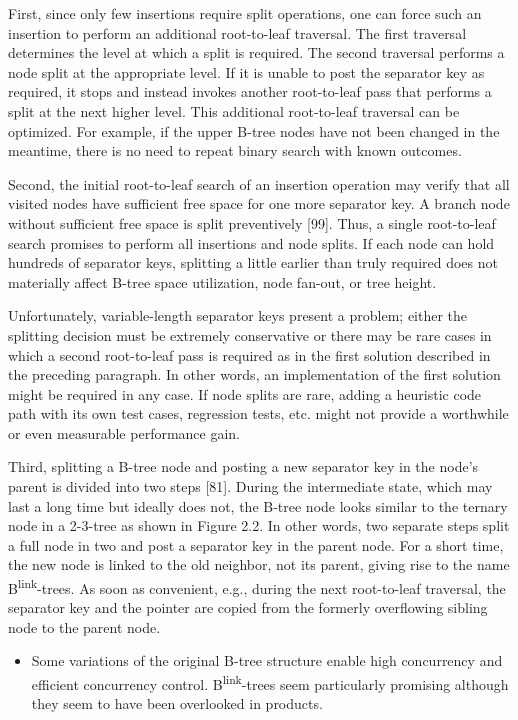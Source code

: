 First, since only few insertions require split operations, one can force
such an insertion to perform an additional root-to-leaf traversal. The
first traversal determines the level at which a split is required. The
second traversal performs a node split at the appropriate level. If it
is unable to post the separator key as required, it stops and instead
invokes another root-to-leaf pass that performs a split at the next
higher level. This additional root-to-leaf traversal can be optimized.
For example, if the upper B-tree nodes have not been changed in the
meantime, there is no need to repeat binary search with known outcomes.

Second, the initial root-to-leaf search of an insertion operation may
verify that all visited nodes have sufficient free space for one more
separator key. A branch node without sufficient free space is split
preventively {[}99{]}. Thus, a single root-to-leaf search promises to
perform all insertions and node splits. If each node can hold hundreds
of separator keys, splitting a little earlier than truly required does
not materially affect B-tree space utilization, node fan-out, or tree
height.

Unfortunately, variable-length separator keys present a problem; either
the splitting decision must be extremely conservative or there may be
rare cases in which a second root-to-leaf pass is required as in the
first solution described in the preceding paragraph. In other words, an
implementation of the first solution might be required in any case. If
node splits are rare, adding a heuristic code path with its own test
cases, regression tests, etc. might not provide a worthwhile or even
measurable performance gain.

Third, splitting a B-tree node and posting a new separator key in the
node's parent is divided into two steps {[}81{]}. During the
intermediate state, which may last a long time but ideally does not, the
B-tree node looks similar to the ternary node in a 2-3-tree as shown in
Figure 2.2. In other words, two separate steps split a full node in two
and post a separator key in the parent node. For a short time, the new
node is linked to the old neighbor, not its parent, giving rise to the
name B\textsuperscript{link}-trees. As soon as convenient, e.g., during
the next root-to-leaf traversal, the separator key and the pointer are
copied from the formerly overflowing sibling node to the parent node.

\begin{itemize}
  \item
  Some variations of the original B-tree structure enable high
concurrency and efficient concurrency control.
B\textsuperscript{link}-trees seem particularly promising although they
seem to have been overlooked in products.
\end{itemize}


